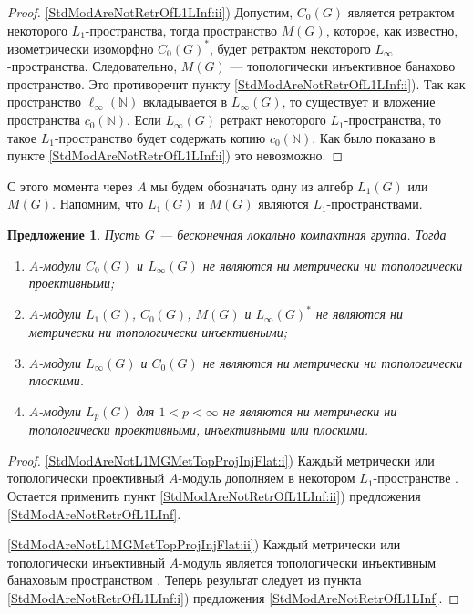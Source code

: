 \documentclass{article}
\numberwithin{equation}{section}
\theoremstyle{plain}
\newtheorem{propos}{Предложение}
\theoremstyle{definition}
\newtheorem{proof}{Доказательство}\def\theproof{}
\begin{document}
\begin{fulltext}
\begin{proof}
\ref{StdModAreNotRetrOfL1LInf:ii}) Допустим, $C_0(G)$ является ретрактом 
некоторого $L_1$-пространства, тогда пространство $M(G)$, которое, как 
известно, изометрически изоморфно $C_0(G)^*$, будет ретрактом некоторого 
$L_\infty$-пространства. Следовательно, $M(G)$ --- топологически 
инъективное банахово пространство. Это противоречит пункту
\ref{StdModAreNotRetrOfL1LInf:i}). Так как пространство 
$\ell_\infty(\mathbb{N})$ вкладывается в $L_\infty(G)$, то существует 
и вложение пространства $c_0(\mathbb{N})$. Если $L_\infty(G)$ ретракт 
некоторого $L_1$-пространства, то такое $L_1$-пространство будет содержать 
копию $c_0(\mathbb{N})$. Как было показано в пункте 
\ref{StdModAreNotRetrOfL1LInf:i}) это невозможно.
\end{proof}

С этого момента через $A$ мы будем обозначать одну из алгебр $L_1(G)$ 
или $M(G)$. Напомним, что $L_1(G)$ и $M(G)$ являются  $L_1$-пространствами.

\begin{propos}\label{StdModAreNotL1MGMetTopProjInjFlat} Пусть $G$ --- 
бесконечная локально компактная группа. Тогда
\begin{enumerate}
    \item $A$-модули $C_0(G)$ и $L_\infty(G)$ не являются ни 
    метрически ни топологически проективными;
    \label{StdModAreNotL1MGMetTopProjInjFlat:i}
    \item $A$-модули $L_1(G)$, $C_0(G)$, $M(G)$ и $L_\infty(G)^*$ 
    не являются ни метрически ни топологически инъективными;
    \label{StdModAreNotL1MGMetTopProjInjFlat:ii}
    \item $A$-модули $L_\infty(G)$ и $C_0(G)$ не являются 
    ни метрически ни топологически плоскими.
    \label{StdModAreNotL1MGMetTopProjInjFlat:iii}
    \item $A$-модули $L_p(G)$ для $1<p<\infty$ не являются 
    ни метрически ни топологически проективными, инъективными 
    или плоскими.
    \label{StdModAreNotL1MGMetTopProjInjFlat:iv}
\end{enumerate}
\end{propos}
\begin{proof} \ref{StdModAreNotL1MGMetTopProjInjFlat:i}) Каждый метрически 
или топологически проективный $A$-модуль дополняем в некотором 
$L_1$-пространстве \cite[предложение~3.8]{NemGeomProjInjFlatBanMod}. 
Остается применить пункт \ref{StdModAreNotRetrOfL1LInf:ii}) предложения
\ref{StdModAreNotRetrOfL1LInf}.

\ref{StdModAreNotL1MGMetTopProjInjFlat:ii}) Каждый метрически или 
топологически инъективный $A$-модуль является топологически 
инъективным банаховым пространством 
\cite[предложение~3.8]{NemGeomProjInjFlatBanMod}. Теперь результат 
следует из пункта \ref{StdModAreNotRetrOfL1LInf:i}) предложения 
\ref{StdModAreNotRetrOfL1LInf}.


\end{proof}
\end{fulltext}
\end{document}
